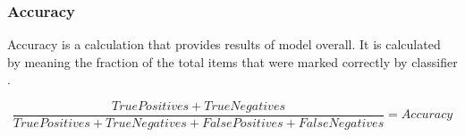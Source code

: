 \subsubsection{Accuracy}
Accuracy is a calculation that provides results of model overall. It is calculated by meaning the fraction of the total items that were marked correctly by classifier \parencite{web:ConfusionMatrixMulticlassfification}.

\[\frac{True Positives + True Negatives}{True Positives + True Negatives + False Positives + False Negatives} = Accuracy \]